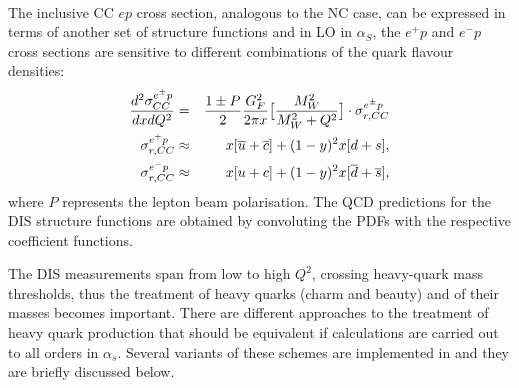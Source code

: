 \\
The inclusive CC $ep$ cross section, analogous to the NC case, can be expressed in terms of another set 
of structure functions and in LO in $\alpha_S$, the $e^+p$ and $e^-p$ cross sections are sensitive to 
different combinations of the quark flavour densities:
\begin{eqnarray}
\centering
   \frac{d^2\sigma_{CC}^{e^{\pm} p}}{dxdQ^2}&=&\frac{1\pm P}{2}\frac{G^2_F}{2\pi x}\big [\frac{M^2_W}{M^2_W+Q^2}\big ]\cdot \sigma_{r,CC}^{e^{\pm} p}\\ 
      \sigma_{r,CC}^{e^{+} p} &\approx& 
        x [\overline u + \overline c] + (1-y)^2 x [d+s], \\
      \sigma_{r,CC}^{e^{-} p} &\approx& 
        x[u+c] + (1-y)^2 x[\overline d + \overline s],
\end{eqnarray}
where $P$ represents the lepton beam polarisation.
%
The QCD predictions for the DIS structure functions are obtained by convoluting 
the PDFs with the respective coefficient functions. 

The DIS measurements
span from low to high $Q^2$, crossing heavy-quark mass thresholds, thus the
treatment of heavy quarks (charm and beauty) and of their masses becomes important. 
There are different approaches to the treatment of heavy quark production that should 
be equivalent if calculations are carried out to all orders in $\alpha_s$. 
Several variants of these schemes are implemented in \fitter and they are briefly discussed below.



